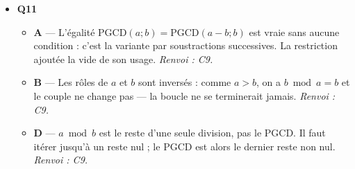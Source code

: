 \begin{itemize}
\begin{itemize}
    \item \textbf{D} — Les rôles de $a$ et de $p$ sont échangés, et l'énoncé devient faux : avec $a=4$ et $p=3$, $3^{3}=27\equiv3\pmod4$, pas $1$. \emph{Renvoi : C8.}
  \end{itemize}
  \item \textbf{Q11}
  \begin{itemize}
    \item \textbf{A} — L'égalité $\mathrm{PGCD}(a;b)=\mathrm{PGCD}(a-b;b)$ est vraie sans aucune condition : c'est la variante par soustractions successives. La restriction ajoutée la vide de son usage. \emph{Renvoi : C9.}
    \item \textbf{B} — Les rôles de $a$ et $b$ sont inversés : comme $a>b$, on a $b \bmod a=b$ et le couple ne change pas — la boucle ne se terminerait jamais. \emph{Renvoi : C9.}
    \item \textbf{D} — $a \bmod b$ est le reste d'une seule division, pas le PGCD. Il faut itérer jusqu'à un reste nul ; le PGCD est alors le dernier reste non nul. \emph{Renvoi : C9.}
  \end{itemize}
\end{itemize}
\fi
